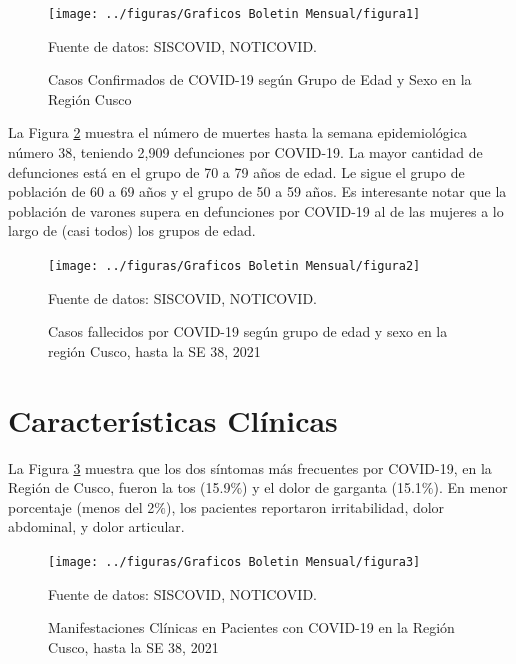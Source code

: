 \documentclass[12pt,a4paper,openany]{book}
\begin{document}
	\begin{figure}[h]
		\caption{Casos Confirmados de COVID-19 según Grupo de Edad y Sexo en la Región Cusco}\label{fig:casos_edad_sexo}
		\begin{center}
			\texttt{[image: ../figuras/Graficos Boletin Mensual/figura1]}
		\end{center}
		{\footnotesize {Fuente de datos: SISCOVID, NOTICOVID.}}
	\end{figure}
	La Figura  \ref{fig:fallecidos_edad_sexo}  muestra el número de muertes hasta la semana epidemiológica número 38, teniendo 2,909 defunciones por COVID-19. La mayor cantidad de defunciones está en el grupo de 70 a 79 años de edad. Le sigue el grupo de población de 60 a 69 años y el grupo de 50 a 59 años. Es interesante notar que la población de varones supera en defunciones por COVID-19 al de las mujeres a lo largo de (casi todos) los grupos de edad.
	\begin{figure}[h]
		\caption{Casos fallecidos por COVID-19 según grupo de edad y sexo en la región Cusco, hasta la SE 38, 2021}\label{fig:fallecidos_edad_sexo}
		\begin{center}
			\texttt{[image: ../figuras/Graficos Boletin Mensual/figura2]}
		\end{center}
		{\footnotesize {Fuente de datos: SISCOVID, NOTICOVID.}}
	\end{figure}
	
	\chapter*{Características Clínicas}
	
	\noindent La Figura \ref{fig:manifestaciones_clinicas}  muestra que los dos síntomas más frecuentes por COVID-19, en la Región de Cusco, fueron la tos (15.9$ \% $) y el dolor de garganta (15.1$ \% $). En menor porcentaje (menos del 2$ \% $), los pacientes reportaron irritabilidad, dolor abdominal, y dolor articular. 

	\begin{figure}[h]
		\caption{Manifestaciones Clínicas en Pacientes con COVID-19 en la Región Cusco, hasta la SE 38, 2021 }\label{fig:manifestaciones_clinicas}
		\begin{center}
			\texttt{[image: ../figuras/Graficos Boletin Mensual/figura3]}
		\end{center}
		{\footnotesize {Fuente de datos: SISCOVID, NOTICOVID.}}
	\end{figure}
\end{document}
